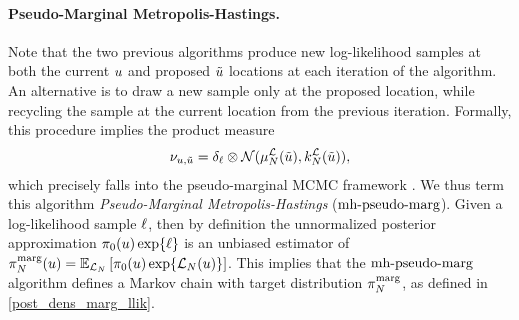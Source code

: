 \documentclass[12pt]{article}
\begin{document}
\paragraph{Pseudo-Marginal Metropolis-Hastings.} \label{pseudo-marg}
Note that the two previous algorithms produce new log-likelihood samples at both the current $\Par$ and proposed 
$\propPar$ locations at each iteration of the algorithm. An alternative is to draw a new sample only at the 
proposed location, while recycling the sample at the current location from the previous iteration. Formally, this procedure
implies the product measure 
\begin{align}
\llikSampDist_{\Par, \propPar} 
= \delta_{\llikSamp} \otimes  
\Gaussian(\emMean[\Ndesign]{\llik}(\propPar), \emKer[\Ndesign]{\llik}(\propPar)), \label{llik_dist_pseudo_marg}
\end{align}
which precisely falls into the pseudo-marginal MCMC framework \citep{pseudoMarginalMCMC}. 
We thus term 
this algorithm \textit{Pseudo-Marginal Metropolis-Hastings} ($\mhPseudoMargLabel$). Given a log-likelihood sample 
$\llikSamp$, then by definition the unnormalized posterior approximation $\priorDens(\Par) \Exp{\llikSamp}$ is 
an unbiased estimator of 
$\llikEmMargDens[\Ndesign](\Par) = \E_{\llikEm[\Ndesign]}\left[\priorDens(\Par) \Exp{\llikEm[\Ndesign](\Par)} \right]$. 
This implies that the $\mhPseudoMargLabel$ algorithm defines a Markov chain with target distribution 
$\llikEmMargDens[\Ndesign]$, as defined in \ref{post_dens_marg_llik}.

\end{document}
